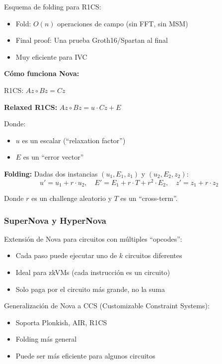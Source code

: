 \documentclass[11pt,a4paper,twoside]{book}
\begin{document}
\begin{definition}[Nova]
Esquema de folding para R1CS:
\begin{itemize}
    \item Fold: $O(n)$ operaciones de campo (sin FFT, sin MSM)
    \item Final proof: Una prueba Groth16/Spartan al final
    \item Muy eficiente para IVC
\end{itemize}
\end{definition}

\begin{mathnote}
\textbf{C\'omo funciona Nova:}

R1CS: $Az \circ Bz = Cz$

\textbf{Relaxed R1CS:} $Az \circ Bz = u \cdot Cz + E$

Donde:
\begin{itemize}
    \item $u$ es un escalar (``relaxation factor'')
    \item $E$ es un ``error vector''
\end{itemize}

\textbf{Folding:}
Dadas dos instancias $(u_1, E_1, z_1)$ y $(u_2, E_2, z_2)$:
\[
u' = u_1 + r \cdot u_2, \quad E' = E_1 + r \cdot T + r^2 \cdot E_2, \quad z' = z_1 + r \cdot z_2
\]

Donde $r$ es un challenge aleatorio y $T$ es un ``cross-term''.
\end{mathnote}

\subsubsection{SuperNova y HyperNova}

\begin{definition}[SuperNova]
Extensi\'on de Nova para circuitos con m\'ultiples ``opcodes'':
\begin{itemize}
    \item Cada paso puede ejecutar uno de $k$ circuitos diferentes
    \item Ideal para zkVMs (cada instrucci\'on es un circuito)
    \item Solo paga por el circuito m\'as grande, no la suma
\end{itemize}
\end{definition}

\begin{definition}[HyperNova]
Generalizaci\'on de Nova a CCS (Customizable Constraint Systems):
\begin{itemize}
    \item Soporta Plonkish, AIR, R1CS
    \item Folding m\'as general
    \item Puede ser m\'as eficiente para algunos circuitos
\end{itemize}
\end{definition}
\end{document}
